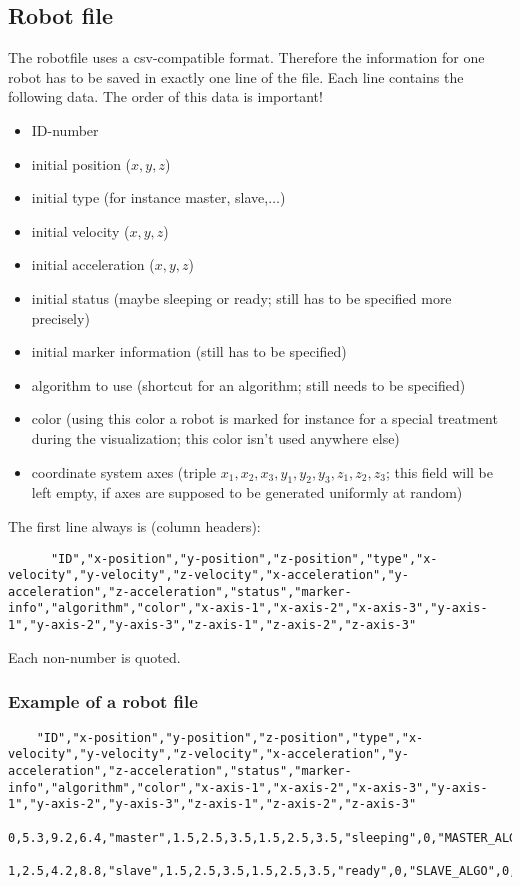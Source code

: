 \subsection{Robot file}
The robotfile uses a csv-compatible format.
Therefore the information for one robot has to be saved in exactly one line of the file.
Each line contains the following data. The order of this data is important!
\begin{itemize}
	\item ID-number
	\item initial position ($x,y,z$)
	\item initial type (for instance master, slave,$\ldots$)
	\item initial velocity ($x,y,z$)
	\item initial acceleration ($x,y,z$)
	\item initial status (maybe sleeping or ready; still has to be specified more precisely)
	\item initial marker information (still has to be specified)
	\item algorithm to use (shortcut for an algorithm; still needs to be specified)
	\item color (using this color a robot is marked for instance for a special treatment during the visualization; this color isn't used anywhere else)
	\item coordinate system axes (triple $x_1,x_2,x_3,y_1,y_2,y_3,z_1,z_2,z_3$; this field will be left empty, if axes are supposed to be generated uniformly at random)
\end{itemize}
The first line always is (column headers):
\begin{lstlisting}
	  "ID","x-position","y-position","z-position","type","x-velocity","y-velocity","z-velocity","x-acceleration","y-acceleration","z-acceleration","status","marker-info","algorithm","color","x-axis-1","x-axis-2","x-axis-3","y-axis-1","y-axis-2","y-axis-3","z-axis-1","z-axis-2","z-axis-3"
\end{lstlisting}
Each non-number is quoted.

\subsubsection{Example of a robot file}
\begin{lstlisting}
	"ID","x-position","y-position","z-position","type","x-velocity","y-velocity","z-velocity","x-acceleration","y-acceleration","z-acceleration","status","marker-info","algorithm","color","x-axis-1","x-axis-2","x-axis-3","y-axis-1","y-axis-2","y-axis-3","z-axis-1","z-axis-2","z-axis-3"
	0,5.3,9.2,6.4,"master",1.5,2.5,3.5,1.5,2.5,3.5,"sleeping",0,"MASTER_ALGO",0,1,0,0,0,1,0,0,0,1
	1,2.5,4.2,8.8,"slave",1.5,2.5,3.5,1.5,2.5,3.5,"ready",0,"SLAVE_ALGO",0,1,0,0,0,1,0,0,0,1
\end{lstlisting}

